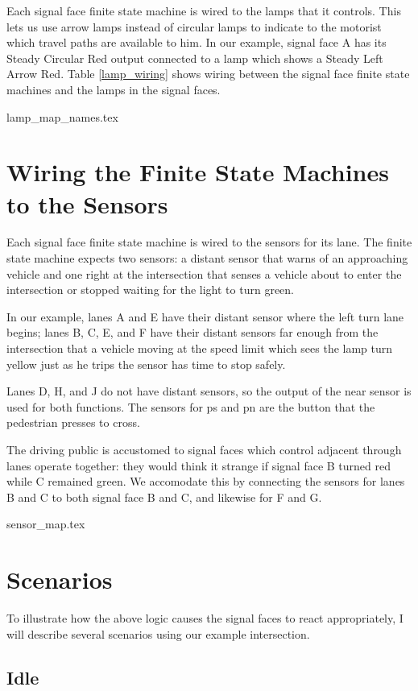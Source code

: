 \documentclass[letterpaper,twoside]{article}
\begin{document}
Each signal face finite state machine is wired to the lamps that
it controls.  This lets us use arrow lamps instead of circular lamps
to indicate to the motorist which travel paths are available to him.
In our example, signal face A has its Steady Circular Red output
connected to a lamp which shows a Steady Left Arrow Red.
Table \ref{lamp_wiring} shows wiring between the signal face finite state
machines and the lamps in the signal faces.

 {lamp_map_names.tex}

\section{Wiring the Finite State Machines to the Sensors}

Each signal face finite state machine is wired to the sensors
for its lane.  The finite state machine expects two sensors:
a distant sensor that warns of an approaching vehicle and
one right at the intersection that senses a vehicle about
to enter the intersection or stopped waiting for the light
to turn green.

In our example, lanes A and E have their distant sensor where
the left turn lane begins; lanes B, C, E, and F have their
distant sensors far enough from the intersection that a vehicle
moving at the speed limit which sees the lamp turn yellow
just as he trips the sensor has time to stop safely.

Lanes D, H, and J do not have distant sensors, so the output
of the near sensor is used for both functions.  The sensors
for ps and pn are the button that the pedestrian presses
to cross.

The driving public is accustomed to signal faces which control
adjacent through lanes operate together: they would think it strange
if signal face B turned red while C remained green.  We accomodate this
by connecting the sensors for lanes B and C to both signal face B
and C, and likewise for F and G.

 {sensor_map.tex}

\section{Scenarios}

To illustrate how the above logic causes the signal faces to react
appropriately, I will describe several scenarios using our example
intersection.

\subsection{Idle}
\end{document}
